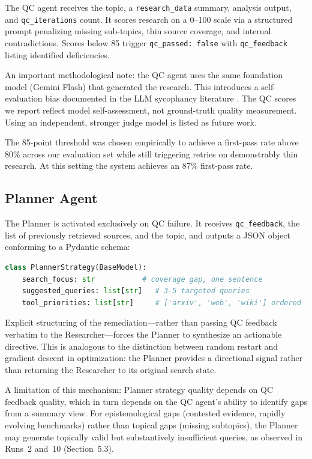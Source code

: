 \documentclass[11pt]{article}
\begin{document}
The QC agent receives the topic, a \texttt{research\_data} summary, analysis
output, and \texttt{qc\_iterations} count. It scores research on a 0--100 scale
via a structured prompt penalizing missing sub-topics, thin source coverage, and
internal contradictions. Scores below 85 trigger \texttt{qc\_passed: false} with
\texttt{qc\_feedback} listing identified deficiencies.

An important methodological note: the QC agent uses the same foundation model
(Gemini Flash) that generated the research. This introduces a self-evaluation
bias documented in the LLM sycophancy literature \citep{sycophancy2023}. The QC
scores we report reflect model self-assessment, not ground-truth quality
measurement. Using an independent, stronger judge model is listed as future work.

The 85-point threshold was chosen empirically to achieve a first-pass rate above
80\% across our evaluation set while still triggering retries on demonstrably
thin research. At this setting the system achieves an 87\% first-pass rate.

\subsection{Planner Agent}

The Planner is activated exclusively on QC failure. It receives
\texttt{qc\_feedback}, the list of previously retrieved sources, and the topic,
and outputs a JSON object conforming to a Pydantic schema:

\begin{lstlisting}[language=Python]
class PlannerStrategy(BaseModel):
    search_focus: str           # coverage gap, one sentence
    suggested_queries: list[str]   # 3-5 targeted queries
    tool_priorities: list[str]     # ['arxiv', 'web', 'wiki'] ordered
\end{lstlisting}

Explicit structuring of the remediation---rather than passing QC feedback
verbatim to the Researcher---forces the Planner to synthesize an actionable
directive. This is analogous to the distinction between random restart and
gradient descent in optimization: the Planner provides a directional signal
rather than returning the Researcher to its original search state.

A limitation of this mechanism: Planner strategy quality depends on QC feedback
quality, which in turn depends on the QC agent's ability to identify gaps from a
summary view. For epistemological gaps (contested evidence, rapidly evolving
benchmarks) rather than topical gaps (missing subtopics), the Planner may
generate topically valid but substantively insufficient queries, as observed in
Runs~2 and~10 (Section~5.3).
\end{document}
